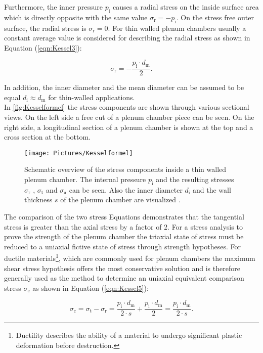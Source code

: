 Furthermore, the inner pressure $p_\text{i}$ causes a radial stress on the inside surface area which is directly opposite with the same value $\sigma_\text{r} = - p_\text{i} $. On the stress free outer surface, the radial stress is $\sigma_\text{r} = 0 $. For thin walled plenum chambers usually a constant average value is considered for describing the radial stress as shown in Equation (\ref{eqn:Kessel3}):

\begin{equation}
\sigma_\text{r} = - \frac{p_\text{i} \cdot d_\text{m}}{2} .
\label{eqn:Kessel3}
\end{equation}

In addition, the inner diameter and the mean diameter can be assumed to be equal $ d_\text{i} \approx  d_\text{m} $ for thin-walled applications.\\
In \autoref{fig:Kesselformel} the stress components are shown through various sectional views. On the left side a free cut of a plenum chamber piece can be seen. On the right side, a longitudinal section of a plenum chamber is shown at the top and a cross section at the bottom.

\begin{figure}[H]
{\centering
\texttt{[image: Pictures/Kesselformel]}
\caption{Schematic overview of the stress components inside a thin walled plenum chamber. The internal pressure $p_\text{i}$ and the resulting stresses $\sigma_\text{r}$ , $\sigma_\text{t}$ and $\sigma_\text{a}$ can be seen. Also the inner diameter $d_\text{i}$ and the wall thickness $s$ of the plenum chamber are visualized \cite{Lapple.2016}.}
\label{fig:Kesselformel}
}
\end{figure}

The comparison of the two stress Equations demonstrates that the tangential stress is greater than the axial stress by a factor of $2$.
For a stress analysis to prove the strength of the plenum chamber the triaxial state of stress must be reduced to a uniaxial fictive state of stress through strength hypotheses. For ductile materials\footnote{Ductility describes the ability of a material to undergo significant plastic deformation before destruction.}, which are commonly used for plenum chambers the maximum shear stress hypothesis offers the most conservative solution and is therefore generally used as the method to determine an uniaxial equivalent comparison stress $\sigma_\text{c}$ as shown in Equation (\ref{eqn:Kessel5}):

\begin{equation}
\sigma_\text{c} = \sigma_\text{t} - \sigma_\text{r} = \frac{p_\text{i} \cdot d_\text{m}}{2 \cdot s} + \frac{p_\text{i} \cdot d_\text{m}}{2} = \frac{p_\text{i} \cdot d_\text{m}}{2 \cdot s} .
\label{eqn:Kessel5}
\end{equation}

